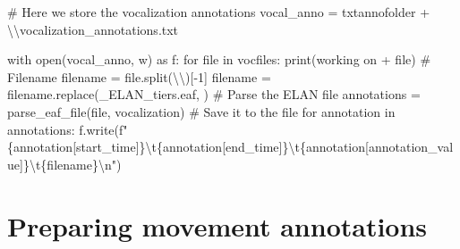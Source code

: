 \documentclass[
  letterpaper,
  DIV=11,
  numbers=noendperiod]{scrreprt}
\newenvironment{Shaded}{\begin{snugshade}}{\end{snugshade}}
\newcommand{\BuiltInTok}[1]{\textcolor[rgb]{0.00,0.23,0.31}{#1}}
\newcommand{\CharTok}[1]{\textcolor[rgb]{0.13,0.47,0.30}{#1}}
\newcommand{\CommentTok}[1]{\textcolor[rgb]{0.37,0.37,0.37}{#1}}
\newcommand{\ControlFlowTok}[1]{\textcolor[rgb]{0.00,0.23,0.31}{#1}}
\newcommand{\DecValTok}[1]{\textcolor[rgb]{0.68,0.00,0.00}{#1}}
\newcommand{\ImportTok}[1]{\textcolor[rgb]{0.00,0.46,0.62}{#1}}
\newcommand{\KeywordTok}[1]{\textcolor[rgb]{0.00,0.23,0.31}{#1}}
\newcommand{\NormalTok}[1]{\textcolor[rgb]{0.00,0.23,0.31}{#1}}
\newcommand{\OperatorTok}[1]{\textcolor[rgb]{0.37,0.37,0.37}{#1}}
\newcommand{\SpecialCharTok}[1]{\textcolor[rgb]{0.37,0.37,0.37}{#1}}
\newcommand{\SpecialStringTok}[1]{\textcolor[rgb]{0.13,0.47,0.30}{#1}}
\newcommand{\StringTok}[1]{\textcolor[rgb]{0.13,0.47,0.30}{#1}}
\begin{document}
\begin{Shaded}
\begin{Highlighting}[]
\CommentTok{\# Here we store the vocalization annotations}
\NormalTok{vocal\_anno }\OperatorTok{=}\NormalTok{ txtannofolder }\OperatorTok{+} \StringTok{\textquotesingle{}}\CharTok{\textbackslash{}\textbackslash{}}\StringTok{vocalization\_annotations.txt\textquotesingle{}}

\ControlFlowTok{with} \BuiltInTok{open}\NormalTok{(vocal\_anno, }\StringTok{\textquotesingle{}w\textquotesingle{}}\NormalTok{) }\ImportTok{as}\NormalTok{ f:}
    \ControlFlowTok{for} \BuiltInTok{file} \KeywordTok{in}\NormalTok{ vocfiles:}
        \BuiltInTok{print}\NormalTok{(}\StringTok{\textquotesingle{}working on \textquotesingle{}} \OperatorTok{+} \BuiltInTok{file}\NormalTok{)}
        \CommentTok{\# Filename}
\NormalTok{        filename }\OperatorTok{=} \BuiltInTok{file}\NormalTok{.split(}\StringTok{\textquotesingle{}}\CharTok{\textbackslash{}\textbackslash{}}\StringTok{\textquotesingle{}}\NormalTok{)[}\OperatorTok{{-}}\DecValTok{1}\NormalTok{]}
\NormalTok{        filename }\OperatorTok{=}\NormalTok{ filename.replace(}\StringTok{\textquotesingle{}\_ELAN\_tiers.eaf\textquotesingle{}}\NormalTok{, }\StringTok{\textquotesingle{}\textquotesingle{}}\NormalTok{)}
        \CommentTok{\# Parse the ELAN file}
\NormalTok{        annotations }\OperatorTok{=}\NormalTok{ parse\_eaf\_file(}\BuiltInTok{file}\NormalTok{, }\StringTok{\textquotesingle{}vocalization\textquotesingle{}}\NormalTok{)}
        \CommentTok{\# Save it to the file}
        \ControlFlowTok{for}\NormalTok{ annotation }\KeywordTok{in}\NormalTok{ annotations:}
\NormalTok{            f.write(}\SpecialStringTok{f"}\SpecialCharTok{\{}\NormalTok{annotation[}\StringTok{\textquotesingle{}start\_time\textquotesingle{}}\NormalTok{]}\SpecialCharTok{\}}\CharTok{\textbackslash{}t}\SpecialCharTok{\{}\NormalTok{annotation[}\StringTok{\textquotesingle{}end\_time\textquotesingle{}}\NormalTok{]}\SpecialCharTok{\}}\CharTok{\textbackslash{}t}\SpecialCharTok{\{}\NormalTok{annotation[}\StringTok{\textquotesingle{}annotation\_value\textquotesingle{}}\NormalTok{]}\SpecialCharTok{\}}\CharTok{\textbackslash{}t}\SpecialCharTok{\{}\NormalTok{filename}\SpecialCharTok{\}}\CharTok{\textbackslash{}n}\SpecialStringTok{"}\NormalTok{)}
\end{Highlighting}
\end{Shaded}


\chapter{Preparing movement
annotations}\label{preparing-movement-annotations}
\end{document}
